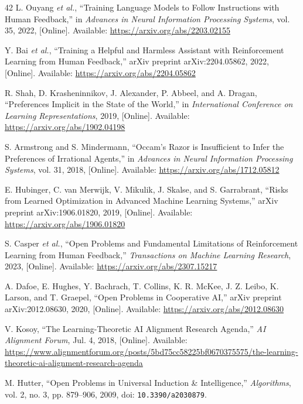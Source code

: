 \begin{thebibliography}{42}
L. Ouyang \emph{et al.}, ``Training Language Models to Follow Instructions with Human Feedback,'' in \emph{Advances in Neural Information Processing Systems}, vol. 35, 2022, [Online]. Available: \url{https://arxiv.org/abs/2203.02155}

Y. Bai \emph{et al.}, ``Training a Helpful and Harmless Assistant with Reinforcement Learning from Human Feedback,'' arXiv preprint arXiv:2204.05862, 2022, [Online]. Available: \url{https://arxiv.org/abs/2204.05862}

R. Shah, D. Krasheninnikov, J. Alexander, P. Abbeel, and A. Dragan, ``Preferences Implicit in the State of the World,'' in \emph{International Conference on Learning Representations}, 2019, [Online]. Available: \url{https://arxiv.org/abs/1902.04198}

S. Armstrong and S. Mindermann, ``Occam's Razor is Insufficient to Infer the Preferences of Irrational Agents,'' in \emph{Advances in Neural Information Processing Systems}, vol. 31, 2018, [Online]. Available: \url{https://arxiv.org/abs/1712.05812}

E. Hubinger, C. van Merwijk, V. Mikulik, J. Skalse, and S. Garrabrant, ``Risks from Learned Optimization in Advanced Machine Learning Systems,'' arXiv preprint arXiv:1906.01820, 2019, [Online]. Available: \url{https://arxiv.org/abs/1906.01820}

S. Casper \emph{et al.}, ``Open Problems and Fundamental Limitations of Reinforcement Learning from Human Feedback,'' \emph{Transactions on Machine Learning Research}, 2023, [Online]. Available: \url{https://arxiv.org/abs/2307.15217}

A. Dafoe, E. Hughes, Y. Bachrach, T. Collins, K. R. McKee, J. Z. Leibo, K. Larson, and T. Graepel, ``Open Problems in Cooperative AI,'' arXiv preprint arXiv:2012.08630, 2020, [Online]. Available: \url{https://arxiv.org/abs/2012.08630}

{\raggedright
V. Kosoy, ``The Learning-Theoretic AI Alignment Research Agenda,'' \emph{AI Alignment Forum}, Jul. 4, 2018, [Online]. Available: \url{https://www.alignmentforum.org/posts/5bd75cc58225bf0670375575/the-learning-theoretic-ai-alignment-research-agenda}\par}

M. Hutter, ``Open Problems in Universal Induction \& Intelligence,'' \emph{Algorithms}, vol. 2, no. 3, pp. 879--906, 2009, doi: \nolinkurl{10.3390/a2030879}.


\end{thebibliography}
